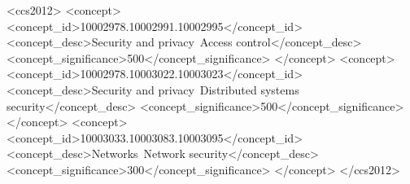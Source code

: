 \documentclass[sigconf,authordraft]{acmart}
\begin{document}
\begin{CCSXML}
<ccs2012>
<concept>
<concept_id>10002978.10002991.10002995</concept_id>
<concept_desc>Security and privacy~Access control</concept_desc>
<concept_significance>500</concept_significance>
</concept>
<concept>
<concept_id>10002978.10003022.10003023</concept_id>
<concept_desc>Security and privacy~Distributed systems security</concept_desc>
<concept_significance>500</concept_significance>
</concept>
<concept>
<concept_id>10003033.10003083.10003095</concept_id>
<concept_desc>Networks~Network security</concept_desc>
<concept_significance>300</concept_significance>
</concept>
</ccs2012>
\end{CCSXML}



\maketitle


% 
% 
% 
% 
% 
% 



\end{document}
